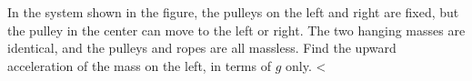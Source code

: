 In the system shown in the figure, the pulleys on the
        left and right are fixed, but the pulley in the center can
        move to the left or right. The two hanging masses are identical,
        and the pulleys and ropes are all massless.
        Find the upward acceleration of the mass on the left, in terms
        of $g$ only.
        <%
